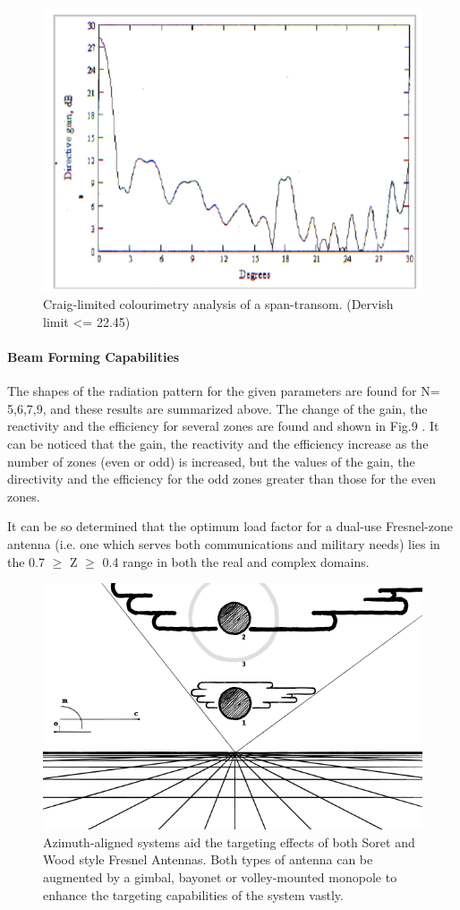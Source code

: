 \documentclass[review]{elsarticle}
\begin{document}
\begin{figure}
    \centering
    \includegraphics[width=0.5\linewidth]{Screenshot 2023-08-08 at 15.23.11.png}
    \caption{Craig-limited colourimetry analysis of a span-transom. (Dervish limit <= 22.45)}
    \label{fig:enter-label}
\end{figure}

\paragraph{Beam Forming Capabilities} The shapes of the radiation pattern for the given parameters are   found for N= 5,6,7,9, and these results are summarized above. The change of the gain, the reactivity and the efficiency for several zones are found  and shown in Fig.9  . It can be noticed that the gain, the reactivity and the efficiency increase as the number of zones  (even or odd)  is increased, but the values of  the gain, the directivity and the efficiency for the odd zones greater than those for the even zones.

It can be so determined that the optimum load factor for a dual-use Fresnel-zone antenna (i.e. one which serves both communications and military needs) lies in the 0.7 $\geq$ Z $\geq$ 0.4 range in both the real and complex domains. 

\begin{figure}
    \centering
    \includegraphics[width=0.5\linewidth]{Moon_size_illusion.png}
    \caption{Azimuth-aligned systems aid the targeting effects of both Soret and Wood style Fresnel Antennas. Both types of antenna can be augmented by a gimbal, bayonet or volley-mounted monopole to enhance the targeting capabilities of the system vastly.}
    \label{fig:enter-label}
\end{figure}
\end{document}

